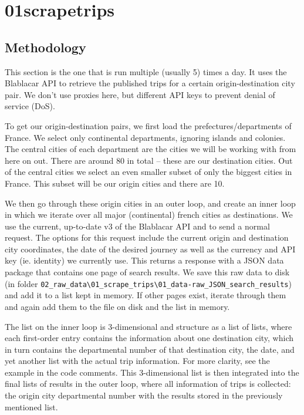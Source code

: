 \documentclass[11pt,a4paper]{article}
\begin{document}
\section{01\textunderscore scrape\textunderscore trips}

\subsection{Methodology}
This section is the one that is run multiple (usually 5) times a day. 
It uses the Blablacar API to retrieve the published trips for a certain origin-destination city pair. 
We don't use proxies here, but different API keys to prevent denial of service (DoS). 

To get our origin-destination pairs, we first load the prefectures/departments of France.
We select only continental departments, ignoring islands and colonies. 
The central cities of each department are the cities we will be working with from here on out.
There are around 80 in total -- these are our destination cities.
Out of the central cities we select an even smaller subset of only the biggest cities in France.
This subset will be our origin cities and there are 10. 

We then go through these origin cities in an outer loop, and create an inner loop in which we iterate over all major (continental) french cities as destinations. 
We use the current, up-to-date v3 of the Blablacar API and to send a normal request.
The options for this request include the current origin and destination city coordinates, the date of the desired journey as well as the currency and API key (ie. identity) we currently use.
This returns a response with a JSON data package that contains one page of search results.
We save this raw data to disk (in folder \verb|02_raw_data\01_scrape_trips\01_data-raw_JSON_search_results|) and add it to a list kept in memory. 
If other pages exist, iterate through them and again add them to the file on disk and the list in memory.

The list on the inner loop is 3-dimensional and structure as a list of lists, where each first-order entry contains the information about one destination city, which in turn contains the departmental number of that destination city, the date, and yet another list with the actual trip information. 
For more clarity, see the example in the code comments. 
This 3-dimensional list is then integrated into the final lists of results in the outer loop, where all information of trips is collected: the origin city departmental number with the results stored in the previously mentioned list. 
\end{document}
